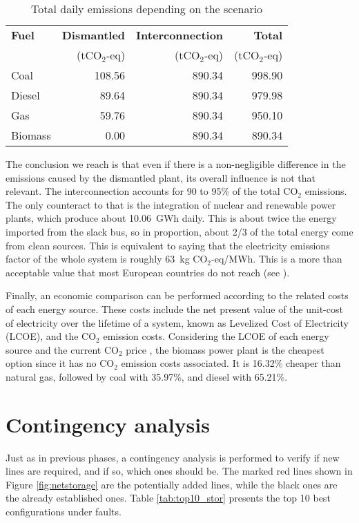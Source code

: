 \begin{table}[!htb]\centering
  \begin{tabular}{lrrr}
    \hline
    \textbf{Fuel} & \textbf{Dismantled} & \textbf{Interconnection} & \textbf{Total} \\
    & (tCO$_2$-eq) &  (tCO$_2$-eq)  &  (tCO$_2$-eq) \\
    \hline
    Coal & 108.56 & 890.34 & 998.90 \\
    Diesel & 89.64 & 890.34 & 979.98 \\
    Gas & 59.76 & 890.34 & 950.10 \\
    Biomass & 0.00 & 890.34 & 890.34 \\
    \hline
  \end{tabular}
  \caption{Total daily emissions depending on the scenario}
  \label{tab:emit}
\end{table}
The conclusion we reach is that even if there is a non-negligible difference in the emissions caused by the dismantled plant, its overall influence is not that relevant. The interconnection accounts for 90 to 95\% of the total CO$_2$ emissions. The only counteract to that is the integration of nuclear and renewable power plants, which produce about 10.06~GWh daily. This is about twice the energy imported from the slack bus, so in proportion, about 2/3 of the total energy come from clean sources. This is equivalent to saying that the electricity emissions factor of the whole system is roughly 63~kg CO$_2$-eq/MWh. This is a more than acceptable value that most European countries do not reach (see \cite{co2iea}).

Finally, an economic comparison can be performed according to the related costs of each energy source. These costs include the net present value of the unit-cost of electricity over the lifetime of a system, known as Levelized Cost of Electricity (LCOE), and the CO$_2$ emission costs. Considering the LCOE of each energy source \cite{irena, roussanaly2020techno, freeing, lazard} and the current CO$_2$ price \cite{ember}, the biomass power plant is the cheapest option since it has no CO$_2$ emission costs associated. It is 16.32\% cheaper than natural gas, followed by coal with 35.97\%, and diesel with 65.21\%.

\section{Contingency analysis}
Just as in previous phases, a contingency analysis is performed to verify if new lines are required, and if so, which ones should be. The marked red lines shown in Figure \ref{fig:netstorage} are the potentially added lines, while the black ones are the already established ones. Table \ref{tab:top10_stor} presents the top 10 best configurations under faults. 

